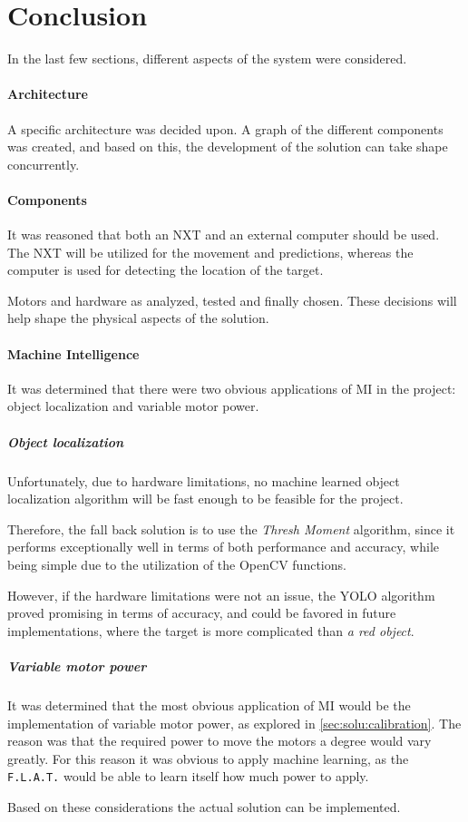 \section{Conclusion}
In the last few sections, different aspects of the system were considered.

\paragraph{Architecture}
A specific architecture was decided upon.
A graph of the different components was created, and based on this, the development of the solution can take shape concurrently.


\paragraph{Components}
It was reasoned that both an NXT and an external computer should be used.
The NXT will be utilized for the movement and predictions, whereas the computer is used for detecting the location of the target.


Motors and hardware as analyzed, tested and finally chosen.
These decisions will help shape the physical aspects of the solution.


\paragraph{Machine Intelligence}
It was determined that there were two obvious applications of MI in the project: object localization and variable motor power.

\subparagraph{Object localization}
Unfortunately, due to hardware limitations, no machine learned object localization algorithm will be fast enough to be feasible for the project.

Therefore, the fall back solution is to use the \textit{Thresh Moment} algorithm, since it performs exceptionally well in terms of both performance and accuracy, while being simple due to the utilization of the OpenCV functions.

However, if the hardware limitations were not an issue, the YOLO algorithm proved promising in terms of accuracy, and could be favored in future implementations, where the target is more complicated than \textit{a red object}.

\subparagraph{Variable motor power}
It was determined that the most obvious application of MI would be the implementation of variable motor power, as explored in \autoref{sec:solu:calibration}.
The reason was that the required power to move the motors a degree would vary greatly.
For this reason it was obvious to apply machine learning, as the \texttt{F.L.A.T.} would be able to learn itself how much power to apply.

Based on these considerations the actual solution can be implemented.
